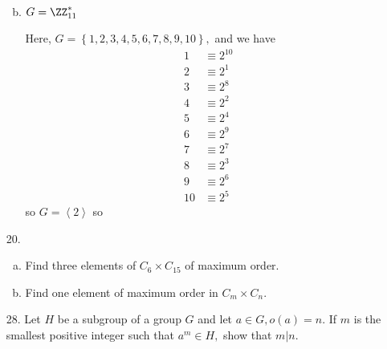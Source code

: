 \documentclass{article}
\begin{document}
\begin{itemize}
\begin{enumerate}[(a)]
\begin{soln}
				\end{soln}

			\item $G=\ZZ_{11}^*$
				\begin{soln}
					Here, $G=\left\{ 1, 2, 3, 4, 5, 6, 7, 8, 9, 10 \right\},$ and we have
					\begin{align*}
						1 &\equiv 2^{10} \\
						2 &\equiv 2^1 \\
						3 &\equiv 2^8 \\
						4 &\equiv 2^2 \\
						5 &\equiv 2^4 \\
						6 &\equiv 2^9 \\
						7 &\equiv 2^7 \\
						8 &\equiv 2^3 \\
						9 &\equiv 2^6 \\
						10 &\equiv 2^5
					\end{align*} so $G=\left< 2\right>$ so 

				\end{soln}
				
		\end{enumerate}

	\item[20.] \begin{enumerate}[(a)]
			\item Find three elements of $C_6\times C_{15}$ of maximum order.

			\item Find one element of maximum order in $C_m\times C_n.$
				
		\end{enumerate}

	\item[28.] Let $H$ be a subgroup of a group $G$ and let $a\in G, o(a)=n.$ If $m$ is the smallest positive integer such that $a^m\in H,$ show that $m|n.$
		
\end{itemize}
\end{document}
